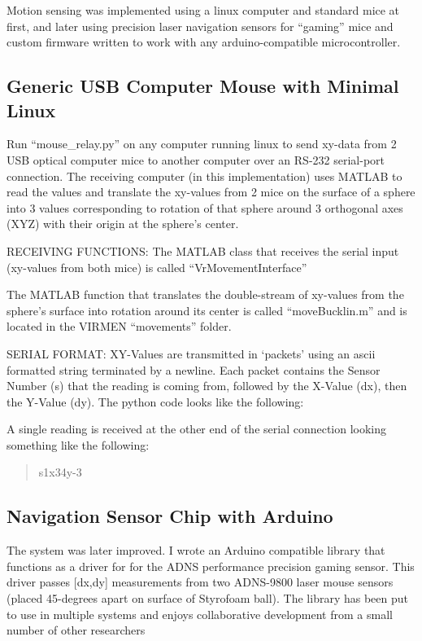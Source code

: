 Motion sensing was implemented using a linux computer and standard mice at first, and later using precision laser navigation sensors for ``gaming'' mice and custom firmware written to work with any arduino-compatible microcontroller.

\subsection{Generic USB Computer Mouse with Minimal Linux}\label{sec:generic-usb-computer-mouse-with-minimal-linux}

Run ``mouse\_relay.py'' on any computer running linux to send xy-data from 2 USB optical computer mice to another computer over an RS-232 serial-port connection.
The receiving computer (in this implementation) uses MATLAB to read the values and translate the xy-values from 2 mice on the surface of a sphere into 3 values corresponding to rotation of that sphere around 3 orthogonal axes (XYZ) with their origin at the sphere's center.

RECEIVING FUNCTIONS: The MATLAB class that receives the serial input (xy-values from both mice) is called ``VrMovementInterface''

The MATLAB function that translates the double-stream of xy-values from the sphere's surface into rotation around its center is called ``moveBucklin.m'' and is located in the VIRMEN ``movements'' folder.

SERIAL FORMAT: XY-Values are transmitted in `packets' using an ascii formatted string terminated by a newline.
Each packet contains the Sensor Number (s) that the reading is coming from, followed by the X-Value (dx), then the Y-Value (dy).
The python code looks like the following:

A single reading is received at the other end of the serial connection looking something like the following:

\begin{quote}
	s1x34y-3
\end{quote}

\subsection{Navigation Sensor Chip with Arduino}\label{sec:navigation-sensor-chip-with-arduino}

The system was later improved.
I wrote an Arduino compatible library that functions as a driver for for the ADNS performance precision gaming sensor.
This driver passes {[}dx,dy{]} measurements from two ADNS-9800 laser mouse sensors (placed 45-degrees apart on surface of Styrofoam ball).
The library has been put to use in multiple systems and enjoys collaborative development from a small number of other researchers \cite{romano2019teensy}

